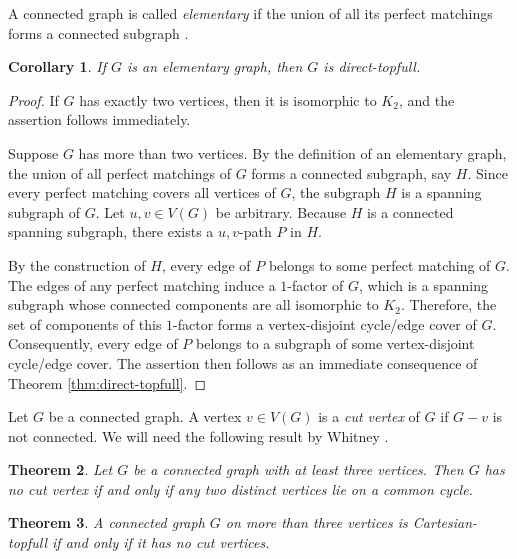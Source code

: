 \documentclass{article}
\newtheorem{theorem}{Theorem}[section]
\newtheorem{corollary}[theorem]{Corollary}
\begin{document}
A connected graph is called \emph{elementary} if the union of all its perfect matchings forms a connected subgraph \cite{lovasz2009matching}.

\begin{corollary}
If $G$ is an elementary graph, then $G$ is direct-topfull.
\end{corollary}

\begin{proof}
If $G$ has exactly two vertices, then it is isomorphic to $K_2$, and the assertion follows immediately. 

Suppose $G$ has more than two vertices. By the definition of an elementary graph, the union of all perfect matchings of $G$ forms a connected subgraph, say $H$. Since every perfect matching covers all vertices of $G$, the subgraph $H$ is a spanning subgraph of $G$. Let $u,v \in V(G)$ be arbitrary. Because $H$ is a connected spanning subgraph, there exists a $u,v$-path $P$ in $H$. 

By the construction of $H$, every edge of $P$ belongs to some perfect matching of $G$. The edges of any perfect matching induce a $1$-factor of $G$, which is a spanning subgraph whose connected components are all isomorphic to $K_2$. Therefore, the set of components of this $1$-factor forms a vertex-disjoint cycle/edge cover of $G$. Consequently, every edge of $P$ belongs to a subgraph of some vertex-disjoint cycle/edge cover. The assertion then follows as an immediate consequence of Theorem \ref{thm:direct-topfull}.
\end{proof}

Let $G$ be a connected graph. A vertex $v \in V(G)$ is a \emph{cut vertex} of $G$ if $G-v$ is not connected. We will need the following result by Whitney \cite{Wh01, Wh02}.

\begin{theorem}\cite{Wh01, Wh02}\label{thm:2connected}
Let $G$ be a connected graph with at least three vertices. Then $G$ has no cut vertex if and only if any two distinct vertices lie on a common cycle.  
\end{theorem}

\begin{theorem}\label{thm:cartesian-topfull}
    A connected graph $G$ on  more than three vertices is Cartesian-topfull if and only if it has no cut vertices.
\end{theorem}
\end{document}
